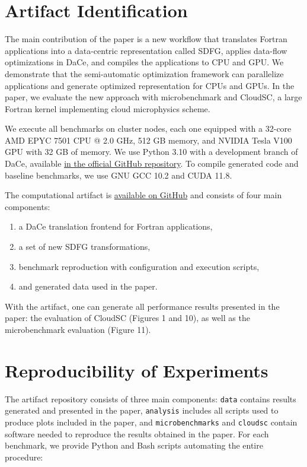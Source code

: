 \documentclass{article}
\begin{document}
\section{Artifact Identification}

The main contribution of the paper is a new workflow that translates Fortran applications
into a data-centric representation called SDFG, applies data-flow optimizations in DaCe, and compiles the
applications to CPU and GPU.
We demonstrate that the semi-automatic optimization framework can parallelize applications
and generate optimized representation for CPUs and GPUs.
In the paper, we evaluate the new approach with microbenchmark and CloudSC, a large Fortran kernel
implementing cloud microphysics scheme.

We execute all benchmarks on cluster nodes, each one equipped with a 32-core AMD EPYC 7501 CPU @ 2.0 GHz,
512 GB memory, and NVIDIA Tesla V100 GPU with 32 GB of memory.
We use Python 3.10 with a development branch of DaCe, available
\href{https://github.com/spcl/dace/tree/fortran_frontend_candidate_2}{in the official GitHub repository}.
To compile generated code and baseline benchmarks, we use GNU GCC 10.2 and CUDA 11.8.

The computational artifact is \href{https://github.com/spcl/f2dace-artifact}{available on GitHub}
and consists of four main components:
\begin{enumerate}
  \item a DaCe translation frontend for Fortran applications,
  \item a set of new SDFG transformations,
  \item benchmark reproduction with configuration and execution scripts,
  \item and generated data used in the paper.
\end{enumerate}
With the artifact, one can generate all performance results presented in the paper: the evaluation
of CloudSC (Figures 1 and 10), as well as the microbenchmark evaluation (Figure 11).

\section{Reproducibility of Experiments}

The artifact repository consists of three main components: \texttt{data} contains results generated and presented
in the paper, \texttt{analysis} includes all scripts used to produce plots included in the paper,
and \texttt{microbenchmarks} and \texttt{cloudsc} contain software needed to reproduce the results obtained in the paper.
For each benchmark, we provide Python and Bash scripts automating the entire procedure:
\end{document}
